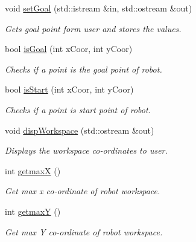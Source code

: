 \begin{DoxyCompactItemize}
void \hyperlink{classRobotWorkspace_a95125cf3d8c6dda97bcc878eeaac2193}{set\+Goal} (std\+::istream \&in, std\+::ostream \&out)
\begin{DoxyCompactList}\small\item\em Gets goal point form user and stores the values. \end{DoxyCompactList}\item 
bool \hyperlink{classRobotWorkspace_a28936c8771879d0b60060a86e7dee074}{is\+Goal} (int x\+Coor, int y\+Coor)
\begin{DoxyCompactList}\small\item\em Checks if a point is the goal point of robot. \end{DoxyCompactList}\item 
bool \hyperlink{classRobotWorkspace_a711613b0d0bff1fec26d8779767ae085}{is\+Start} (int x\+Coor, int y\+Coor)
\begin{DoxyCompactList}\small\item\em Checks if a point is start point of robot. \end{DoxyCompactList}\item 
void \hyperlink{classRobotWorkspace_ab2c72c766062691c0b44b437d01965a0}{disp\+Workspace} (std\+::ostream \&out)
\begin{DoxyCompactList}\small\item\em Displays the workspace co-\/ordinates to user. \end{DoxyCompactList}\item 
int \hyperlink{classRobotWorkspace_a688d393981dff808642f1672fec20956}{getmaxX} ()
\begin{DoxyCompactList}\small\item\em Get max x co-\/ordinate of robot workspace. \end{DoxyCompactList}\item 
int \hyperlink{classRobotWorkspace_ae0e2861515a029cf9156ca7128e5e799}{getmaxY} ()
\begin{DoxyCompactList}\small\item\em Get max Y co-\/ordinate of robot workspace. \end{DoxyCompactList}\end{DoxyCompactItemize}
